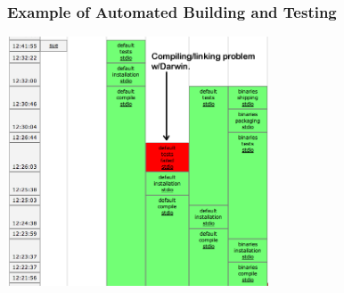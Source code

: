 \documentclass{beamer}
\begin{document}
\begin{frame}
  \frametitle{Example of Automated Building and Testing}

  \begin{center}
    \includegraphics[height=2.9in]{figs/buildbotsuccess}
  \end{center}

\end{frame}

\end{document}
